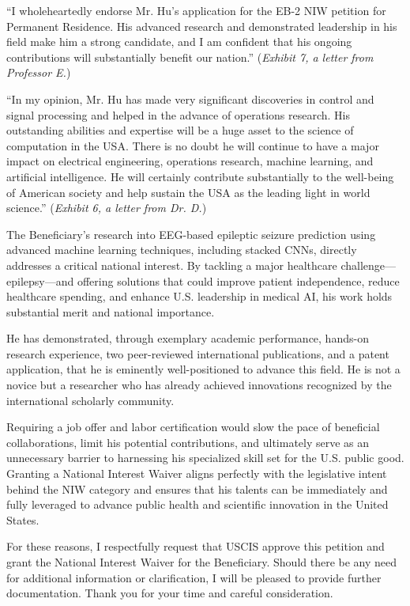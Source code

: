 \documentclass{article}
\begin{document}
“I wholeheartedly endorse Mr. Hu's application for the EB-2 NIW petition for Permanent Residence. His advanced research and demonstrated leadership in his field make him a strong candidate, and I am confident that his ongoing contributions will substantially benefit our nation.” ({\it Exhibit 7, a letter from Professor E.}) 

“In my opinion, Mr. Hu has made very significant discoveries in control and signal processing and helped in the advance of operations research. His outstanding abilities and expertise will be a huge asset to the science of computation in the USA. There is no doubt he will continue to have a major impact on electrical engineering, operations research, machine learning, and artificial intelligence. He will certainly contribute substantially to the well-being of American society and help sustain the USA as the leading light in world science.” ({\it Exhibit 6, a letter from Dr. D.}) 

The Beneficiary’s research into EEG-based epileptic seizure prediction using advanced machine learning techniques, including stacked CNNs, directly addresses a critical national interest. By tackling a major healthcare challenge—epilepsy—and offering solutions that could improve patient independence, reduce healthcare spending, and enhance U.S. leadership in medical AI, his work holds substantial merit and national importance.

He has demonstrated, through exemplary academic performance, hands-on research experience, two peer-reviewed international publications, and a patent application, that he is eminently well-positioned to advance this field. He is not a novice but a researcher who has already achieved innovations recognized by the international scholarly community.

Requiring a job offer and labor certification would slow the pace of beneficial collaborations, limit his potential contributions, and ultimately serve as an unnecessary barrier to harnessing his specialized skill set for the U.S. public good. Granting a National Interest Waiver aligns perfectly with the legislative intent behind the NIW category and ensures that his talents can be immediately and fully leveraged to advance public health and scientific innovation in the United States.

For these reasons, I respectfully request that USCIS approve this petition and grant the National Interest Waiver for the Beneficiary. Should there be any need for additional information or clarification, I will be pleased to provide further documentation.
Thank you for your time and careful consideration.
\end{document}
